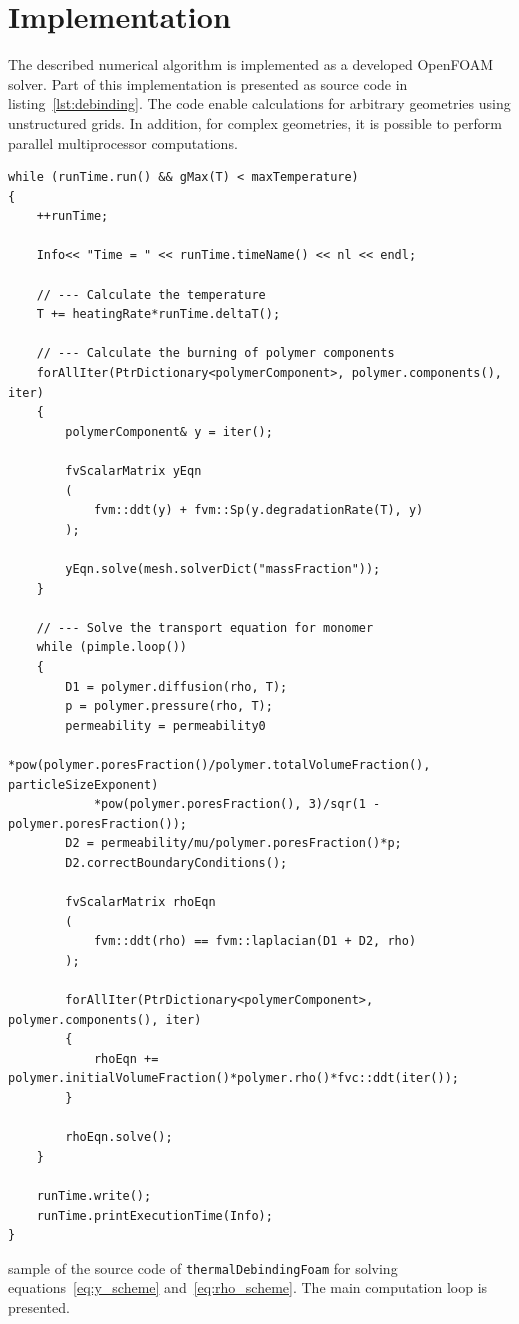 \documentclass{article}
\newcommand{\OpenFOAM}{OpenFOAM\textregistered\xspace}
\begin{document}
\section{Implementation}

The described numerical algorithm is implemented as a developed \OpenFOAM solver.
Part of this implementation is presented as source code in listing~\ref{lst:debinding}.
The code enable calculations for arbitrary geometries using unstructured grids.
In addition, for complex geometries, it is possible to perform parallel multiprocessor computations.

\begin{listing}[b!]
    \footnotesize
    \begin{verbatim}
while (runTime.run() && gMax(T) < maxTemperature)
{
    ++runTime;

    Info<< "Time = " << runTime.timeName() << nl << endl;

    // --- Calculate the temperature
    T += heatingRate*runTime.deltaT();

    // --- Calculate the burning of polymer components
    forAllIter(PtrDictionary<polymerComponent>, polymer.components(), iter)
    {
        polymerComponent& y = iter();

        fvScalarMatrix yEqn
        (
            fvm::ddt(y) + fvm::Sp(y.degradationRate(T), y)
        );

        yEqn.solve(mesh.solverDict("massFraction"));
    }

    // --- Solve the transport equation for monomer
    while (pimple.loop())
    {
        D1 = polymer.diffusion(rho, T);
        p = polymer.pressure(rho, T);
        permeability = permeability0
            *pow(polymer.poresFraction()/polymer.totalVolumeFraction(), particleSizeExponent)
            *pow(polymer.poresFraction(), 3)/sqr(1 - polymer.poresFraction());
        D2 = permeability/mu/polymer.poresFraction()*p;
        D2.correctBoundaryConditions();

        fvScalarMatrix rhoEqn
        (
            fvm::ddt(rho) == fvm::laplacian(D1 + D2, rho)
        );

        forAllIter(PtrDictionary<polymerComponent>, polymer.components(), iter)
        {
            rhoEqn += polymer.initialVolumeFraction()*polymer.rho()*fvc::ddt(iter());
        }

        rhoEqn.solve();
    }

    runTime.write();
    runTime.printExecutionTime(Info);
}
    \end{verbatim}
    \caption{
        sample of the source code of \texttt{thermalDebindingFoam}
        for solving equations~\eqref{eq:y_scheme} and~\eqref{eq:rho_scheme}.
        The main computation loop is presented.
    }
    \label{lst:debinding}
\end{listing}
\end{document}
